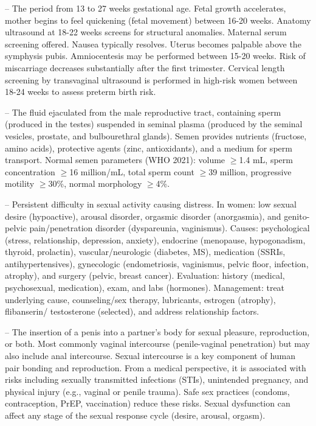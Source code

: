 -- The period from 13 to 27 weeks gestational age. Fetal growth accelerates, mother begins to feel quickening (fetal movement) between 16-20 weeks. Anatomy ultrasound at 18-22 weeks screens for structural anomalies. Maternal serum screening offered. Nausea typically resolves. Uterus becomes palpable above the symphysis pubis. Amniocentesis may be performed between 15-20 weeks. Risk of miscarriage decreases substantially after the first trimester. Cervical length screening by transvaginal ultrasound is performed in high-risk women between 18-24 weeks to assess preterm birth risk.

-- The fluid ejaculated from the male reproductive tract, containing sperm (produced in the testes) suspended in seminal plasma (produced by the seminal vesicles, prostate, and bulbourethral glands). Semen provides nutrients (fructose, amino acids), protective agents (zinc, antioxidants), and a medium for sperm transport. Normal semen parameters (WHO 2021): volume \(\ge\)1.4 mL, sperm concentration \(\ge\)16 million/mL, total sperm count \(\ge\)39 million, progressive motility \(\ge\)30\%, normal morphology \(\ge\)4\%.

-- Persistent difficulty in sexual activity causing distress. In women: low sexual desire (hypoactive), arousal disorder, orgasmic disorder (anorgasmia), and genito-pelvic pain/penetration disorder (dyspareunia, vaginismus). Causes: psychological (stress, relationship, depression, anxiety), endocrine (menopause, hypogonadism, thyroid, prolactin), vascular/neurologic (diabetes, MS), medication (SSRIs, antihypertensives), gynecologic (endometriosis, vaginismus, pelvic floor, infection, atrophy), and surgery (pelvic, breast cancer). Evaluation: history (medical, psychosexual, medication), exam, and labs (hormones). Management: treat underlying cause, counseling/sex therapy, lubricants, estrogen (atrophy), flibanserin/ testosterone (selected), and address relationship factors.

-- The insertion of a penis into a partner's body for sexual pleasure, reproduction, or both. Most commonly vaginal intercourse (penile-vaginal penetration) but may also include anal intercourse. Sexual intercourse is a key component of human pair bonding and reproduction. From a medical perspective, it is associated with risks including sexually transmitted infections (STIs), unintended pregnancy, and physical injury (e.g., vaginal or penile trauma). Safe sex practices (condoms, contraception, PrEP, vaccination) reduce these risks. Sexual dysfunction can affect any stage of the sexual response cycle (desire, arousal, orgasm).

